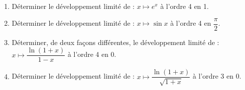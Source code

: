 
\begin{exercice}\label{exoautoanalyseCTU-50}




\begin{enumerate}
\item Déterminer le développement limité de : $x \mapsto e^{x}$ à l'ordre 4 en 1.
\item Déterminer le développement limité de : $x \mapsto \sin x$ à l'ordre 4 en $\dfrac{\pi}{2}$.
\item Déterminer, de deux fa\c cons différentes,  le développement limité de :  $x \mapsto \dfrac{\ln(1+ x)}{1-x}$ à l'ordre 4 en 0. 
\item Déterminer le développement limité de : $x \mapsto \dfrac{\ln(1+x)}{\sqrt{1+x}}$ à l'ordre 3 en 0.
\end{enumerate}




\end{exercice}
